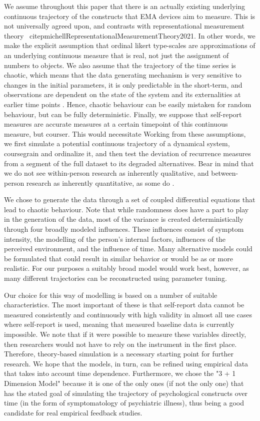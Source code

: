 \documentclass[utf8]{FrontiersinVancouver}
\begin{document}
We assume throughout this paper that there is an actually existing underlying continuous trajectory of the constructs that EMA devices aim to measure. This is not universally agreed upon, and contrasts with representational measurement theory \
citep{michellRepresentationalMeasurementTheory2021}. In other words, we make the explicit assumption that ordinal likert type-scales are approximations of an underlying continuous measure that is real, not just the assignment of numbers to objects. We also assume that the trajectory of the time series is chaotic, which means that the data generating mechanism is very sensitive to changes in the initial parameters, it is only predictable in the short-term, and observations are dependent on the state of the system and its externalities at earlier time points \citep{olthofComplexityPsychologicalSelfratings2020b}.  Hence, chaotic behaviour can be easily mistaken for random behaviour, but can be fully deterministic. Finally, we suppose that self-report measures are accurate measures at a certain timepoint of this continuous measure, but courser. This would necessitate  Working from these assumptions, we first simulate a potential continuous trajectory of a dynamical system, coursegrain and ordinalize it, and then test the deviation of recurrence measures from a segment of the full dataset to its degraded alternatives. Bear in mind that we do not see within-person research as inherently qualitative, and between-person research as inherently quantitative, as some do \citep{leenarsDefenseIdiographicApproach2002}. 

We chose to generate the data through a set of coupled differential equations that lead to chaotic behaviour. Note that while randomness does have a part to play in the generation of the data, most of the variance is created deterministically through four broadly modeled influences. These influences consist of symptom intensity, the modelling of the person's internal factors, influences of the perceived environment, and the influence of time. Many alternative models could be formulated that could result in similar behavior or would be as or more realistic. For our purposes a suitably broad model would work best, however, as many different trajectories can be reconstructed using parameter tuning. 

Our choice for this way of modelling is based on a number of suitable characteristics. The most important of these is that self-report data cannot be measured consistently and continuously with high validity in almost all use cases where self-report is used, meaning that measured baseline data is currently impossible. We note that if it were possible to measure these variables directly, then researchers would not have to rely on the instrument in the first place. Therefore, theory-based simulation is a necessary starting point for further research. We hope that the models, in turn, can be refined using empirical data that takes into account time dependence. Furthermore, we chose the "3 + 1 Dimension Model" because it is one of the only ones (if not the only one) that has the stated goal of simulating the trajectory of psychological constructs over time (in the form of symptomatology of psychiatric illness), thus being a good candidate for real empirical feedback studies.
\end{document}
